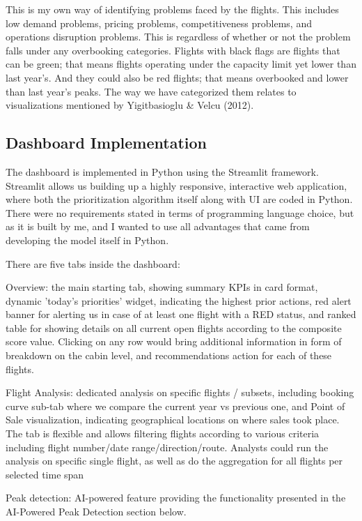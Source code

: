 This is my own way of identifying problems faced by the flights. This includes low demand problems, pricing problems, competitiveness problems, and operations disruption problems. This is regardless of whether or not the problem falls under any overbooking categories. Flights with black flags are flights that can be green; that means flights operating under the capacity limit yet lower than last year's. And they could also be red flights; that means overbooked and lower than last year's peaks. The way we have categorized them relates to visualizations mentioned by Yigitbasioglu \& Velcu (2012).

\subsection{Dashboard Implementation}

The dashboard is implemented in Python using the Streamlit framework. Streamlit allows us building up a highly responsive, interactive web application, where both the prioritization algorithm itself along with UI are coded in Python. There were no requirements stated in terms of programming language choice, but as it is built by me, and I wanted to use all advantages that came from developing the model itself in Python.

There are five tabs inside the dashboard:

Overview: the main starting tab, showing summary KPIs in card format, dynamic 'today's priorities' widget, indicating the highest prior actions, red alert banner for alerting us in case of at least one flight with a RED status, and ranked table for showing details on all current open flights according to the composite score value. Clicking on any row would bring additional information in form of breakdown on the cabin level, and recommendations action for each of these flights.

Flight Analysis: dedicated analysis on specific flights / subsets, including booking curve sub-tab where we compare the current year vs previous one, and Point of Sale visualization, indicating geographical locations on where sales took place. The tab is flexible and allows filtering flights according to various criteria including flight number/date range/direction/route. Analysts could run the analysis on specific single flight, as well as do the aggregation for all flights per selected time span

Peak detection: AI-powered feature providing the functionality presented in the AI-Powered Peak Detection section below.

